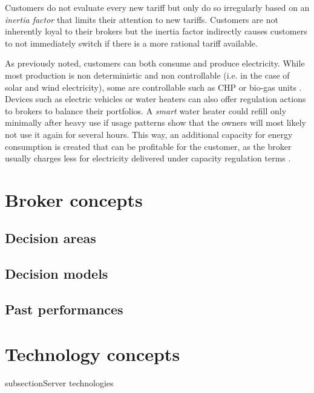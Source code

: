 Customers do not evaluate every new tariff but only do so irregularly based on an \emph{inertia factor} that limits their attention to new tariffs. Customers are not inherently loyal to their brokers but the inertia factor indirectly causes customers to not immediately switch if there is a more rational tariff available. 

As previously noted, customers can both consume and produce electricity. While most production is non deterministic and non controllable (i.e. in the case of solar and wind electricity), some are controllable such as \ac{CHP} or bio-gas units \cite[p.16]{ketter2018powertac}. Devices such as electric vehicles or water heaters can also offer regulation actions to brokers to balance their portfolios. A \emph{smart} water heater could refill only minimally after heavy use if usage patterns show that the owners will most likely not use it again for several hours. This way, an additional capacity for energy consumption is created that can be profitable for the customer, as the broker usually charges less for electricity delivered under capacity regulation terms \cite[p.14ff.]{ketter2018powertac}.

\section{Broker concepts}
\subsection{Decision areas}
\subsection{Decision models}
\subsection{Past performances}

\section{Technology concepts}
subsection{Server technologies}


